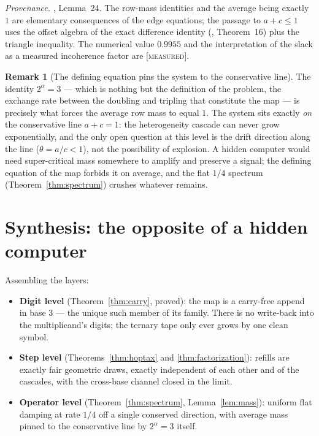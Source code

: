 \documentclass[11pt]{article}
\theoremstyle{definition}
\newtheorem{remark}[theorem]{Remark}
\newcommand{\MEASURED}{\textup{[\textsc{measured}]}}
\begin{document}
\emph{Provenance.} \cite{Note2026}, Lemma~24. The row-mass identities and the average
being exactly $1$ are elementary consequences of the edge equations; the passage to
$a + c \leq 1$ uses the offset algebra of the exact difference identity
(\cite{Note2026}, Theorem~16) plus the triangle inequality. The numerical value
$0.9955$ and the interpretation of the slack as a measured incoherence factor are
\MEASURED.

\begin{remark}[The defining equation pins the system to the conservative line]
The identity $2^{\alpha} = 3$ --- which is nothing but the definition of the problem,
the exchange rate between the doubling and tripling that constitute the map --- is
precisely what forces the average row mass to equal $1$. The system sits exactly
\emph{on} the conservative line $a + c = 1$: the heterogeneity cascade can never grow
exponentially, and the only open question at this level is the drift direction along
the line ($\theta = a/c < 1$), not the possibility of explosion. A hidden computer
would need super-critical mass somewhere to amplify and preserve a signal; the defining
equation of the map forbids it on average, and the flat $1/4$ spectrum
(Theorem~\ref{thm:spectrum}) crushes whatever remains.
\end{remark}

\section{Synthesis: the opposite of a hidden computer}

Assembling the layers:

\begin{itemize}
\item \textbf{Digit level} (Theorem~\ref{thm:carry}, proved): the map is a carry-free
append in base $3$ --- the unique such member of its family. There is no write-back
into the multiplicand's digits; the ternary tape only ever grows by one clean symbol.
\item \textbf{Step level} (Theorems~\ref{thm:hoptax} and \ref{thm:factorization}):
refills are exactly fair geometric draws, exactly independent of each other and of the
cascades, with the cross-base channel closed in the limit.
\item \textbf{Operator level} (Theorem~\ref{thm:spectrum}, Lemma~\ref{lem:mass}):
uniform flat damping at rate $1/4$ off a single conserved direction, with average mass
pinned to the conservative line by $2^{\alpha} = 3$ itself.
\end{itemize}
\end{document}

